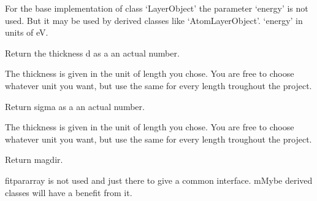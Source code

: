 \documentclass[letterpaper,10pt,english]{sphinxmanual}
\begin{document}
\begin{fulllineitems}
\begin{fulllineitems}
For the base implementation of class ‘LayerObject’ the parameter ‘energy’ is not used. But it may be used by derived classes like ‘AtomLayerObject’.
‘energy’ in units of eV.

\end{fulllineitems}


\begin{fulllineitems}
\label{\detokenize{modules-api/samplerepresentation:SampleRepresentation.LayerObject.getD}}
Return the thickness d as a an actual number.

The thickness is given in the unit of length you chose. You are free to choose whatever unit you want, but use the same for every length troughout the project.

\end{fulllineitems}


\begin{fulllineitems}
\label{\detokenize{modules-api/samplerepresentation:SampleRepresentation.LayerObject.getSigma}}
Return sigma as a an actual number.

The thickness is given in the unit of length you chose. You are free to choose whatever unit you want, but use the same for every length troughout the project.

\end{fulllineitems}


\begin{fulllineitems}
\label{\detokenize{modules-api/samplerepresentation:SampleRepresentation.LayerObject.getMagDir}}
Return magdir.

fitpararray is not used and just there to give a common interface. mMybe derived classes will have a benefit from it.

\end{fulllineitems}


\end{fulllineitems}

\end{document}
